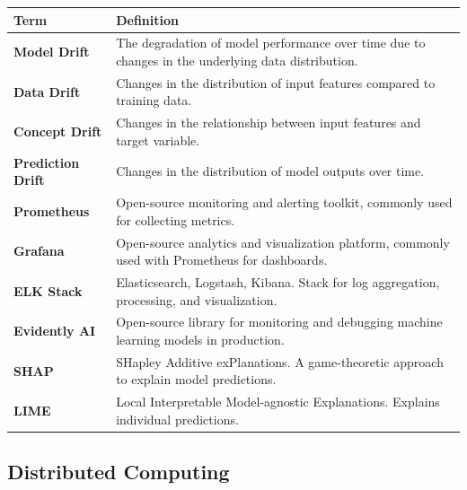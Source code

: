 \documentclass[11pt]{article}
\begin{document}
\begin{longtable}{|p{}|p{}|}
\hline
\textbf{Term} & \textbf{Definition} \\
\hline
\endhead
\textbf{Model Drift} & The degradation of model performance over time due to changes in the underlying data distribution. \\
\hline
\textbf{Data Drift} & Changes in the distribution of input features compared to training data. \\
\hline
\textbf{Concept Drift} & Changes in the relationship between input features and target variable. \\
\hline
\textbf{Prediction Drift} & Changes in the distribution of model outputs over time. \\
\hline
\textbf{Prometheus} & Open-source monitoring and alerting toolkit, commonly used for collecting metrics. \\
\hline
\textbf{Grafana} & Open-source analytics and visualization platform, commonly used with Prometheus for dashboards. \\
\hline
\textbf{ELK Stack} & Elasticsearch, Logstash, Kibana. Stack for log aggregation, processing, and visualization. \\
\hline
\textbf{Evidently AI} & Open-source library for monitoring and debugging machine learning models in production. \\
\hline
\textbf{SHAP} & SHapley Additive exPlanations. A game-theoretic approach to explain model predictions. \\
\hline
\textbf{LIME} & Local Interpretable Model-agnostic Explanations. Explains individual predictions. \\
\hline
\end{longtable}

\subsection{Distributed Computing}
\end{document}
